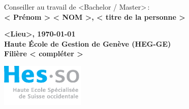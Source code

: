 \begin{titlepage}
\begin{center}
			\vspace{1cm}
      \vfill

			Conseiller au travail de <Bachelor / Master>\,:\\
				\textbf{\Large{} < Prénom > \textsc{< NOM >}, < titre de la personne >}\\

			\vspace{2cm}
			\vfill		

			\textbf{\large <Lieu>, \today{}}\\
				\textbf{\large Haute École de Gestion de Genève (HEG-GE)}\\
				\textbf{\large Filière < compléter >}\\

		\end{center}

 		\vfill
		
			\begin{flushright}
		 		\includegraphics[width=4cm]{images/hes-logo.eps}
			\end{flushright}
  
	\end{titlepage}
\makeatother

\styleCenter		%
